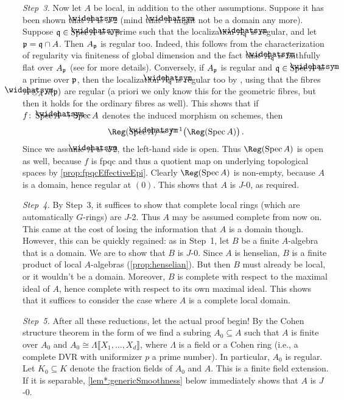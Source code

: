 \begin{proof*}
	\emph{Step~3.} Now let $A$ be local, in addition to the other assumptions. Suppose it has been shown that $\roof{A}$ is $J$-2 (mind that $\roof{A}$ might not be a domain any more). Suppose $\qq\in\Spec \roof{A}$ is a prime such that the localization $\roof{A}_\qq$ is regular, and let $\mathfrak{p}=\mathfrak{q}\cap A$. Then $A_{\mathfrak{p}}$ is regular too. Indeed, this follows from the characterization of regularity via finiteness of global dimension and the fact that $\roof{A}_\qq$ is faithfully flat over $A_{\mathfrak{p}}$ (see  for more details). Conversely, if $A_{\mathfrak{p}}$ is regular and $\qq\in\Spec \roof{A}$ is a prime over $\mathfrak{p}$, then the localization $\roof{A}_\qq$ is regular too by , using that the fibres $\roof{A}\otimes_A\kappa(\pp)$ are regular (a priori we only know this for the geometric fibres, but then it holds for the ordinary fibres as well). This shows that if $f\colon \Spec \roof{A}\morphism\Spec A$ denotes the induced morphism on schemes, then
	\begin{equation*}
	\Reg(\Spec \roof{A})=f^{-1}\big(\Reg(\Spec A)\big)\,.
	\end{equation*}
	Since we assume $\roof{A}$ is $J$-2, the left-hand side is open. Thus $\Reg(\Spec A)$ is open as well, because $f$ is fpqc and thus a quotient map on underlying topological spaces by \cref{prop:fpqcEffectiveEpi}. Clearly $\Reg(\Spec A)$ is non-empty, because $A$ is a domain, hence regular at $(0)$. This shows that $A$ is $J$-0, as required.
	
	\emph{Step~4.} By Step~3, it suffices to show that complete local rings (which are automatically $G$-rings) are $J$-2. Thus $A$ may be assumed complete from now on. This came at the cost of losing the information that $A$ is a domain though. However, this can be quickly regained: as in Step~1, let $B$ be a finite $A$-algebra that is a domain. We are to show that $B$ is $J$-0. Since $A$ is henselian, $B$ is a finite product of local $A$-algebras (\cref{prop:henselian}). But then $B$ must already be local, or it wouldn't be a domain. Moreover, $B$ is complete with respect to the maximal ideal of $A$, hence complete with respect to its own maximal ideal. This shows that it suffices to consider the case where $A$ is a complete local domain.
	
	\emph{Step~5.} After all these reductions, let the actual proof begin! By the Cohen structure theorem in the form of  we find a subring $A_0\subseteq A$ such that $A$ is finite over $A_0$ and $A_0\cong \Lambda\llbracket X_1,\dotsc,X_d\rrbracket$, where $\Lambda$ is a field or a Cohen ring (i.e., a complete DVR with uniformizer $p$ a prime number). In particular, $A_0$ is regular. Let $K_0\subseteq K$ denote the fraction fields of $A_0$ and $A$. This is a finite field extension. If it is separable, \cref{lem*:genericSmoothness} below immediately shows that $A$ is $J$-0.
	

\end{proof*}
